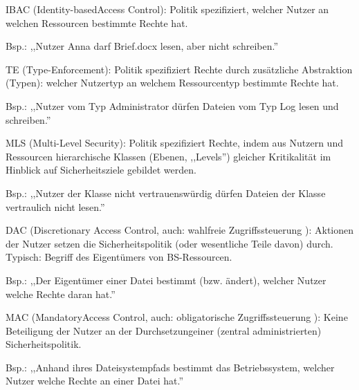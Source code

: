 \documentclass[a4paper]{article}
\begin{document}
\begin{multicols}{3}
    \begin{itemize*}
        \item
        IBAC (Identity-basedAccess Control): Politik spezifiziert, welcher
        Nutzer an welchen Ressourcen bestimmte Rechte hat.
        \begin{itemize*}
            \item Bsp.: ,,Nutzer Anna darf Brief.docx lesen, aber nicht schreiben.''
        \end{itemize*}
        \item
        TE (Type-Enforcement): Politik spezifiziert Rechte durch zusätzliche
        Abstraktion (Typen): welcher Nutzertyp an welchem Ressourcentyp
        bestimmte Rechte hat.
        \begin{itemize*}
            \item Bsp.: ,,Nutzer vom Typ Administrator dürfen Dateien vom Typ Log lesen und schreiben.''
        \end{itemize*}
        \item
        MLS (Multi-Level Security): Politik spezifiziert Rechte, indem aus
        Nutzern und Ressourcen hierarchische Klassen (Ebenen, ,,Levels'')
        gleicher Kritikalität im Hinblick auf Sicherheitsziele gebildet
        werden.
        \begin{itemize*}
            \item Bsp.: ,,Nutzer der Klasse nicht vertrauenswürdig dürfen Dateien der Klasse vertraulich nicht lesen.''
        \end{itemize*}
        \item
        DAC (Discretionary Access Control, auch: wahlfreie Zugriffssteuerung
        ): Aktionen der Nutzer setzen die Sicherheitspolitik (oder wesentliche
        Teile davon) durch. Typisch: Begriff des Eigentümers von
        BS-Ressourcen.
        \begin{itemize*}
            \item Bsp.: ,,Der Eigentümer einer Datei bestimmt (bzw. ändert), welcher Nutzer welche Rechte daran hat.''
        \end{itemize*}
        \item
        MAC (MandatoryAccess Control, auch: obligatorische Zugriffssteuerung
        ): Keine Beteiligung der Nutzer an der Durchsetzungeiner (zentral
        administrierten) Sicherheitspolitik.
        \begin{itemize*}
            \item Bsp.: ,,Anhand ihres Dateisystempfads bestimmt das Betriebssystem, welcher Nutzer welche Rechte an einer Datei hat.''
        \end{itemize*}
    \end{itemize*}



\end{multicols}
\end{document}

